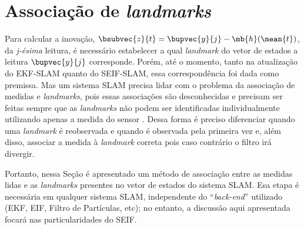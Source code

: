 \section{Associação de \textit{landmarks}}
\label{sec:data-association}
Para calcular a inovação, $\bsubvec{z}{t} = \bupvec{y}{j} - \mb{h}(\mean{t})$, da \textit{j-ésima} leitura, é necessário estabelecer a qual \textit{landmark} do vetor de estados a leitura $\bupvec{y}{j}$ 
corresponde. Porém, até o momento, tanto na atualização do EKF-SLAM quanto do SEIF-SLAM, essa correspondência foi dada como premissa. 
Mas um sistema SLAM precisa lidar com o problema da associação de medidas e \textit{landmarks}, pois essas associações são desconhecidas 
e precisam ser feitas sempre que as \textit{landmarks} não podem ser 
identificadas individualmente utilizando apenas a medida do sensor \cite[p.~4]{liu2003results}. Dessa forma é preciso diferenciar quando uma 
\textit{landmark} é reobservada e quando é observada pela primeira vez e, além disso, associar a medida à \textit{landmark} correta pois caso 
contrário o filtro irá divergir.

Portanto, nessa Seção é apresentado um método de associação entre as 
medidas lidas e as \textit{landmarks} presentes no vetor de estados do 
sistema SLAM. Esa etapa é necessária em qualquer sistema SLAM,  
independente do ``\textit{back-end}'' utilizado (EKF, EIF, Filtro 
de Partículas, etc); no entanto, a discussão aqui apresentada focará nas 
particularidades do SEIF.

